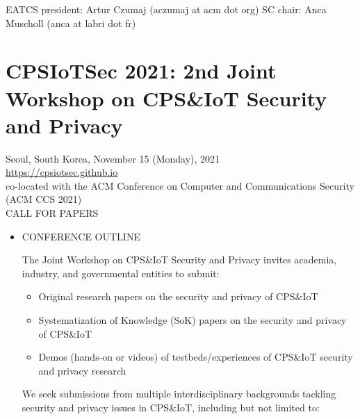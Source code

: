 \documentclass[prodmode,acmtecs]{acmsmall} %
\begin{document}
\begin{itemize}
  EATCS president: Artur Czumaj (aczumaj at acm dot org) SC chair: Anca Muscholl (anca at labri dot fr)  
 
\end{itemize}\section{CPSIoTSec 2021: 2nd Joint Workshop on CPS\&IoT Security and Privacy}\label{CPSIoTSec2021}  Seoul, South Korea, November 15 (Monday), 2021\\ 
  \href{https://cpsiotsec.github.io}{https://cpsiotsec.github.io}\\ 
  co-located with the ACM Conference on Computer and Communications Security (ACM CCS 2021)\\ 
CALL FOR PAPERS 

\begin{itemize}\item  CONFERENCE OUTLINE 
 
  The Joint Workshop on CPS\&IoT Security and Privacy invites academia, industry, and governmental entities to submit: 
 
\begin{itemize}\item  Original research papers on the security and privacy of CPS\&IoT
\item  Systematization of Knowledge (SoK) papers on the security and privacy of CPS\&IoT
\item  Demos (hands-on or videos) of testbeds/experiences of CPS\&IoT security and privacy research
\end{itemize} 
  We seek submissions from multiple interdisciplinary backgrounds tackling security and privacy issues in CPS\&IoT, including but not limited to: 
 

\end{itemize}
\end{document}
